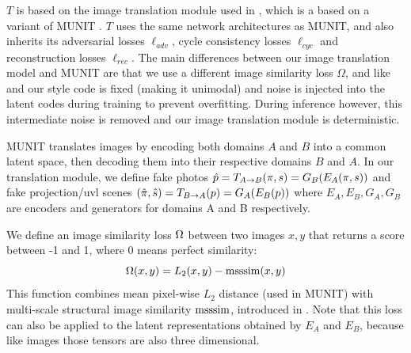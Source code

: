 \documentclass{article}
\begin{document}
		$T$ is based on the image translation module used in \citet{surgical_video_translation}, which is a based on a variant \cite{surgical_image_translation} of MUNIT \cite{munit}. 
		$T$ uses the same network architectures as MUNIT, and also inherits its adversarial losses $\ell_{adv}$, cycle consistency losses $\ell_{cyc}$ and reconstruction losses $\ell_{rec}$.
		The main differences between our image translation model and MUNIT are that we use a different image similarity loss $\Omega$, and like \citet[]{surgical_image_translation} and \citet[]{surgical_video_translation} our style code is fixed (making it unimodal) and noise is injected into the latent codes during training to prevent overfitting. 
		During inference however, this intermediate noise is removed and our image translation module is deterministic. 

		MUNIT translates images by encoding both domains $A$ and $B$ into a common latent space, then decoding them into their respective domains  $B$ and $A$.
		In our translation module, we define fake photos $\hat{p} = T_{A\rightarrow B}(\pi,s) = G_B(E_A(\pi,s))$ and fake projection/uvl scenes $(\hat{\pi},\hat{s}) = T_{B\rightarrow A}(p) = G_A(E_B(p))$
			where $E_A, E_B, G_A, G_B$ are encoders and generators for domains A and B respectively.

		
		We define an image similarity loss $\Omega$ between two images $x,y$ that returns a score between -1 and 1, where 0 means perfect similarity:
		\begin{equation}
		\label{eq:omega}
			\Omega(x,y) = L_2(x,y)-\text{msssim}(x,y) 
		\end{equation}
		This function combines mean pixel-wise $L_2$ distance (used in MUNIT) with multi-scale structural image similarity $\text{msssim}$, introduced in \citep{msssim}. Note that this loss can also be applied to the latent representations obtained by $E_A$ and $E_B$, because like images those tensors are also three dimensional.
\end{document}
